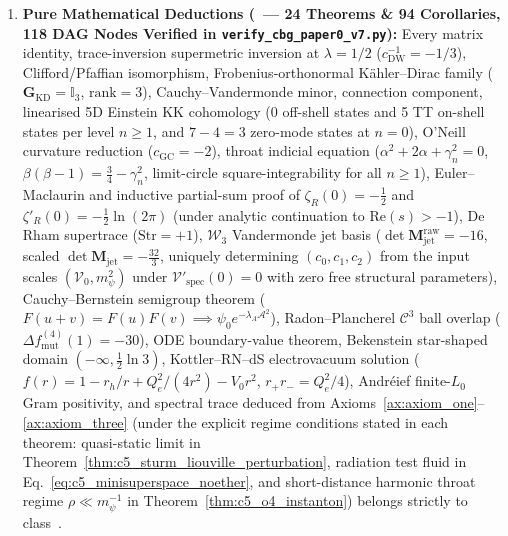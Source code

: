 \documentclass[11pt,a4paper]{article}
\newcommand{\catD}{\text{\textbf{\textcolor{blue!75!black}{[D]}}}}
\theoremstyle{definition}
\theoremstyle{plain}
\theoremstyle{remark}
\begin{document}
\begin{enumerate}[label=\arabic*.]
  \item \textbf{Pure Mathematical Deductions (\catD\ --- 24 Theorems \& 94 Corollaries, 118 DAG Nodes Verified in \texttt{verify\_cbg\_paper0\_v7.py}):}
  Every matrix identity, trace-inversion supermetric inversion at $\lambda = 1/2$ ($c_{\mathrm{DW}}^{-1} = -1/3$), Clifford/Pfaffian isomorphism, Frobenius-orthonormal K\"ahler--Dirac family ($\mathbf{G}_{\mathrm{KD}} = \mathbb{I}_3$, $\mathrm{rank} = 3$), Cauchy--Vandermonde minor, connection component, linearised 5D Einstein KK cohomology (0 off-shell states and 5 TT on-shell states per level $n \ge 1$, and $7 - 4 = 3$ zero-mode states at $n = 0$), O'Neill curvature reduction ($c_{\mathrm{GC}}=-2$), throat indicial equation ($\alpha^2 + 2\alpha + \gamma_n^2 = 0$, $\beta(\beta-1) = \frac{3}{4} - \gamma_n^2$, limit-circle square-integrability for all $n \ge 1$), Euler--Maclaurin and inductive partial-sum proof of $\zeta_R(0) = -\frac{1}{2}$ and $\zeta'_R(0) = -\frac{1}{2}\ln(2\pi)$ (under analytic continuation to $\mathrm{Re}(s) > -1$), De Rham supertrace ($\mathrm{Str}=+1$), $\mathcal{W}_3$ Vandermonde jet basis ($\det\mathbf{M}_{\mathrm{jet}}^{\mathrm{raw}}=-16$, scaled $\det\mathbf{M}_{\mathrm{jet}} = -\frac{32}{3}$, uniquely determining $(c_0, c_1, c_2)$ from the input scales $(\mathcal{V}_0, m_\psi^2)$ under $\mathcal{V}'_{\mathrm{spec}}(0)=0$ with zero free structural parameters), Cauchy--Bernstein semigroup theorem ($F(u+v)=F(u)F(v) \implies \psi_0 e^{-\lambda_A\mathcal{A}^2}$), Radon--Plancherel $\mathcal{C}^3$ ball overlap ($\Delta f_{\mathrm{mut}}^{(4)}(1)=-30$), ODE boundary-value theorem, Bekenstein star-shaped domain $(-\infty, \frac{1}{2}\ln 3)$, Kottler--RN--dS electrovacuum solution ($f(r) = 1 - r_h/r + Q_e^2/(4r^2) - V_0 r^2$, $r_+ r_- = Q_e^2/4$), Andr\'eief finite-$L_0$ Gram positivity, and spectral trace deduced from Axioms~\ref{ax:axiom_one}--\ref{ax:axiom_three} (under the explicit regime conditions stated in each theorem: quasi-static limit in Theorem~\ref{thm:c5_sturm_liouville_perturbation}, radiation test fluid in Eq.~\eqref{eq:c5_minisuperspace_noether}, and short-distance harmonic throat regime $\rho \ll m_\psi^{-1}$ in Theorem~\ref{thm:c5_o4_instanton}) belongs strictly to class~\catD.


\end{enumerate}
\end{document}
